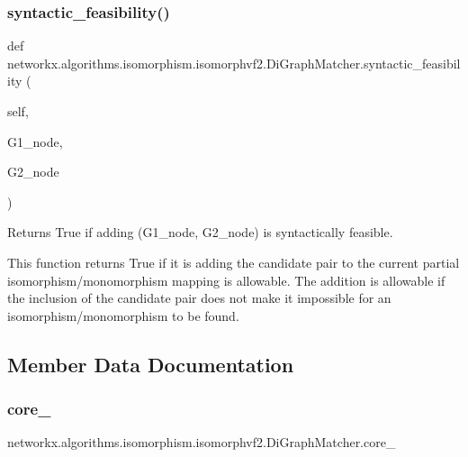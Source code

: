 \subsubsection{\texorpdfstring{syntactic\+\_\+feasibility()}{syntactic\_feasibility()}}
{\footnotesize\ttfamily def networkx.\+algorithms.\+isomorphism.\+isomorphvf2.\+Di\+Graph\+Matcher.\+syntactic\+\_\+feasibility (\begin{DoxyParamCaption}\item[{}]{self,  }\item[{}]{G1\+\_\+node,  }\item[{}]{G2\+\_\+node }\end{DoxyParamCaption})}

\begin{DoxyVerb}Returns True if adding (G1_node, G2_node) is syntactically feasible.

This function returns True if it is adding the candidate pair
to the current partial isomorphism/monomorphism mapping is allowable.
The addition is allowable if the inclusion of the candidate pair does
not make it impossible for an isomorphism/monomorphism to be found.
\end{DoxyVerb}
 

\subsection{Member Data Documentation}
\mbox{\label{classnetworkx_1_1algorithms_1_1isomorphism_1_1isomorphvf2_1_1DiGraphMatcher_a269e9006d68f19d5bc62f165aed6b4e5}} 
\subsubsection{\texorpdfstring{core\+\_}{core\_1}}
{\footnotesize\ttfamily networkx.\+algorithms.\+isomorphism.\+isomorphvf2.\+Di\+Graph\+Matcher.\+core\+\_}

\mbox{\label{classnetworkx_1_1algorithms_1_1isomorphism_1_1isomorphvf2_1_1DiGraphMatcher_a055c31fd55d3ad5e9fda2985e8894a6f}} 
